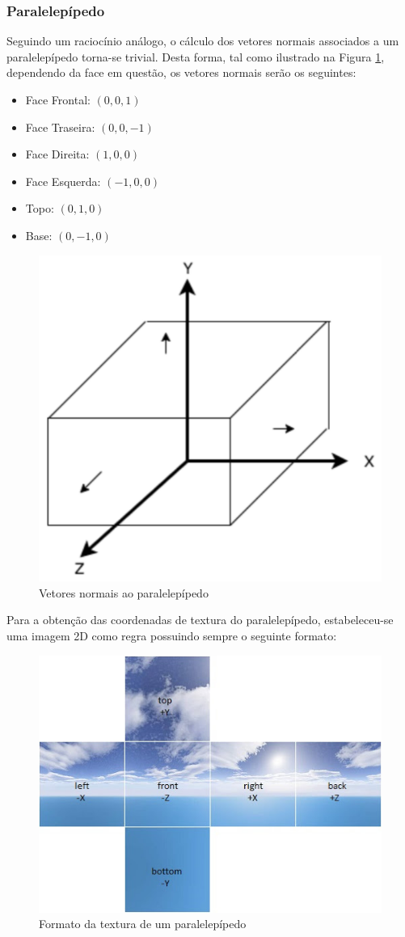 \documentclass[a4paper, 11pt]{article}
\begin{document}
\subsubsection{Paralelepípedo}

Seguindo um raciocínio análogo, o cálculo dos vetores normais associados a um paralelepípedo 
torna-se trivial. Desta forma, tal como ilustrado na Figura \ref{fig:box}, dependendo da face em 
questão, os vetores normais serão os seguintes:

\begin{multicols}{2}
\begin{itemize}
    \item Face Frontal: $(0, 0, 1)$
    \item Face Traseira: $(0, 0, -1)$
    \item Face Direita: $(1, 0, 0)$
    \item Face Esquerda: $(-1, 0, 0)$
    \item Topo: $(0, 1, 0)$
    \item Base: $(0, -1, 0)$
\end{itemize}
\end{multicols}

\begin{figure}[H]
    \centering
    \includegraphics[width=.3\textwidth]{img/box.png}
    \caption{Vetores normais ao paralelepípedo}
    \label{fig:box}
\end{figure}

\pagebreak

Para a obtenção das coordenadas de textura do paralelepípedo, estabeleceu-se uma imagem 2D como 
regra possuindo sempre o seguinte formato:

\begin{figure}[H]
    \centering
    \includegraphics[width=.6\textwidth]{img/cubemap.jpg}
    \caption{Formato da textura de um paralelepípedo}
\end{figure}
\end{document}
